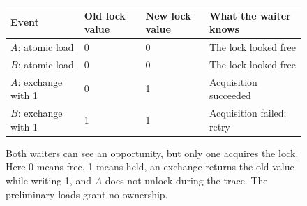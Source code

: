 \begin{figure}[htbp]
  \centering
  \begin{tabular}{@{}llll@{}}
    \toprule
    Event & Old lock value & New lock value & What the waiter knows \\
    \midrule
    $A$: atomic load & 0 & 0 & The lock looked free \\
    $B$: atomic load & 0 & 0 & The lock looked free \\
    $A$: exchange with 1 & 0 & 1 & Acquisition succeeded \\
    $B$: exchange with 1 & 1 & 1 & Acquisition failed; retry \\
    \bottomrule
  \end{tabular}
  \caption{Both waiters can see an opportunity, but only one acquires the lock. Here 0 means free, 1 means held, an exchange returns the old value while writing 1, and $A$ does not unlock during the trace. The preliminary loads grant no ownership.}
  \label{fig:competing-lock-waiters}
\end{figure}

